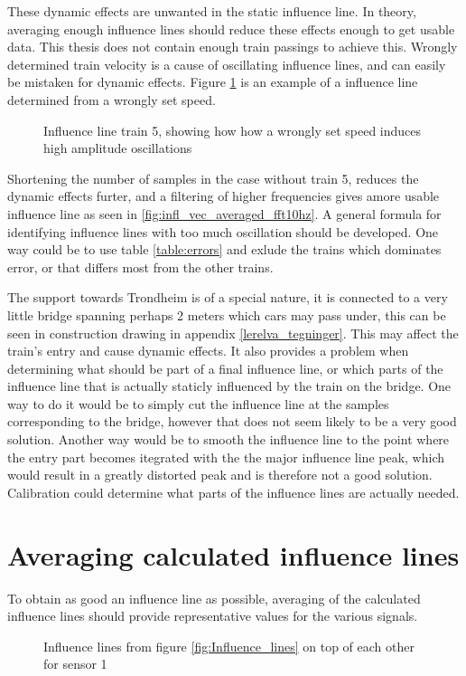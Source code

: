 These dynamic effects are unwanted in the static influence line. In theory, averaging enough influence lines should reduce these effects enough to get usable data. This thesis does not contain enough train passings to achieve this.
Wrongly determined train velocity is a cause of oscillating influence lines, and can easily be mistaken for dynamic effects. Figure \ref{fig:train5_wrongSpeed} is an example of a influence line determined from a wrongly set speed.
\begin{figure}
	\begin{adjustbox}{center}
		
	\end{adjustbox}
	\caption{Influence line train 5, showing how how a wrongly set speed induces high amplitude oscillations}
	\label{fig:train5_wrongSpeed}
\end{figure}
Shortening the number of samples in the case without train 5, reduces the dynamic effects furter, and a filtering of higher frequencies gives amore usable influence line as seen in \ref{fig:infl_vec_averaged_fft10hz}.
A general formula for identifying influence lines with too much oscillation should be developed. One way could be to use table \ref{table:errors} and exlude the trains which dominates error, or that differs most from the other trains.

The support towards Trondheim is of a special nature, it is connected to a very little bridge spanning perhaps 2 meters which cars may pass under, this can be seen in construction drawing in appendix \ref{lerelva_tegninger}. This may affect the train's entry and cause dynamic effects. It also provides a problem when determining what should be part of a final influence line, or which parts of the influence line that is actually staticly influenced by the train on the bridge.
One way to do it would be to simply cut the influence line at the samples corresponding to the bridge, however that does not seem likely to be a very good solution. Another way would be to smooth the influence line to the point where the entry part becomes itegrated with the the major influence line peak, which would result in a greatly distorted peak and is therefore not a good solution. Calibration could determine what parts of the influence lines are actually needed.

\section{Averaging calculated influence lines}
To obtain as good an influence line as possible, averaging of the calculated influence lines should provide representative values for the various signals.
\begin{figure}[H]
	\begin{adjustbox}{center}
		
	\end{adjustbox}
	\caption{Influence lines from figure \ref{fig:Influence_lines} on top of each other for sensor 1}
	\label{fig:infl_all_trains}
\end{figure}

